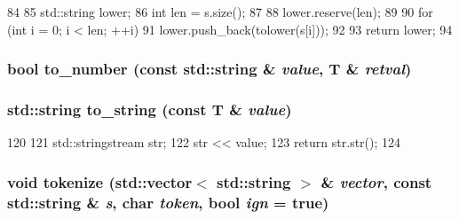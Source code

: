 \begin{DoxyCode}
84 {
85     std::string lower;
86     int len = s.size();
87 
88     lower.reserve(len);
89 
90     for (int i = 0; i < len; ++i)
91         lower.push_back(tolower(s[i]));
92 
93     return lower;
94 }
\end{DoxyCode}
\hypertarget{str_8hh_aeb8c492d16beefb8b43c31d4e3dc3ab0}{
\subsubsection[{to\_\-number}]{\setlength{\rightskip}{0pt plus 5cm}bool to\_\-number (const std::string \& {\em value}, \/  T \& {\em retval})}}
\label{str_8hh_aeb8c492d16beefb8b43c31d4e3dc3ab0}
\hypertarget{str_8hh_a61cce639667f3e4f1d8790c4fec5c439}{
\subsubsection[{to\_\-string}]{\setlength{\rightskip}{0pt plus 5cm}std::string to\_\-string (const T \& {\em value})}}
\label{str_8hh_a61cce639667f3e4f1d8790c4fec5c439}



\begin{DoxyCode}
120 {
121     std::stringstream str;
122     str << value;
123     return str.str();
124 }
\end{DoxyCode}
\hypertarget{str_8hh_a8db9863989509957fc95cdbcfd38cf62}{
\subsubsection[{tokenize}]{\setlength{\rightskip}{0pt plus 5cm}void tokenize ({\bf std::vector}$<$ std::string $>$ \& {\em vector}, \/  const std::string \& {\em s}, \/  char {\em token}, \/  bool {\em ign} = {\ttfamily true})}}
\label{str_8hh_a8db9863989509957fc95cdbcfd38cf62}
